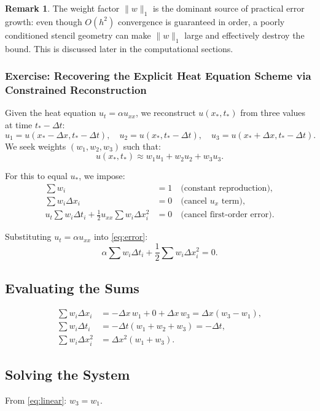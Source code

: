 \documentclass[12pt, a4paper, twoside]{report}
\theoremstyle{plain}
\theoremstyle{definition}
\newtheorem{remark}[theorem]{Remark}
\begin{document}
\begin{remark}
    The weight factor $\|w\|_1$ is the dominant source of practical error
    growth: even though $O(h^2)$ convergence is guaranteed in order,
    a poorly conditioned stencil geometry can make $\|w\|_1$ large and
    effectively destroy the bound.
    This is discussed later in the computational sections.
\end{remark}
 
\subsubsection*{Exercise: Recovering the Explicit Heat Equation Scheme 
via Constrained Reconstruction} 
Given the heat equation $u_t = \alpha u_{xx}$, we reconstruct $u(x_*, t_*)$ from three values at time $t_* - \Delta t$:
\[
u_1 = u(x_* - \Delta x, t_* - \Delta t), \quad
u_2 = u(x_*, t_* - \Delta t), \quad
u_3 = u(x_* + \Delta x, t_* - \Delta t).
\]
We seek weights $(w_1, w_2, w_3)$ such that:
\[
u(x_*, t_*) \approx w_1 u_1 + w_2 u_2 + w_3 u_3.
\]

For this to equal $u_*$, we impose:
\begin{align}
\sum w_i &= 1 \quad \text{(constant reproduction)}, \label{eq:const} \\
\sum w_i \Delta x_i &= 0 \quad \text{(cancel $u_x$ term)}, \label{eq:linear} \\
u_t \sum w_i \Delta t_i + \frac{1}{2} u_{xx} \sum w_i \Delta x_i^2 &= 0 \quad \text{(cancel first-order error)}. \label{eq:error}
\end{align}

Substituting $u_t = \alpha u_{xx}$ into \eqref{eq:error}:
\[
\alpha \sum w_i \Delta t_i + \frac{1}{2} \sum w_i \Delta x_i^2 = 0.
\]

\subsection*{Evaluating the Sums}
\begin{align*}
\sum w_i \Delta x_i &= -\Delta x \, w_1 + 0 + \Delta x \, w_3 = \Delta x(w_3 - w_1), \\
\sum w_i \Delta t_i &= -\Delta t(w_1 + w_2 + w_3) = -\Delta t, \\
\sum w_i \Delta x_i^2 &= \Delta x^2(w_1 + w_3).
\end{align*}

\subsection*{Solving the System}
From \eqref{eq:linear}: $w_3 = w_1$.
\end{document}
